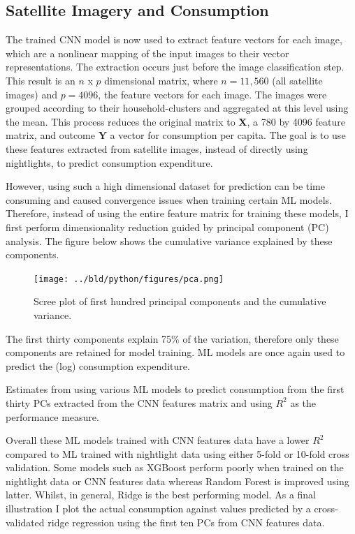 \documentclass[11pt, a4paper, leqno]{article}
\begin{document}
\subsection{Satellite Imagery and Consumption}

 The trained CNN model is now used to extract feature vectors for each image, which are a nonlinear mapping of the input images to their vector representations. The extraction occurs just before the image classification step. This result is an $n$ x $p$ dimensional matrix, where $n = 11,560$ (all satellite images) and $p = 4096$, the feature vectors for each image. The images were grouped according to their household-clusters and aggregated at this level using the mean. This process reduces the original matrix to $\textbf{X}$, a 780 by 4096 feature matrix, and outcome $\textbf{Y}$ a vector for consumption per capita. The goal is to use these features extracted from satellite images, instead of directly using nightlights, to predict consumption expenditure.

 However, using such a high dimensional dataset for prediction can be time consuming and caused convergence issues when training certain ML models. Therefore, instead of using the entire feature matrix for training these models, I first perform dimensionality reduction guided by principal component (PC) analysis. The figure below shows the cumulative variance explained by these components. 

\begin{figure}[H]
\centering
    \texttt{[image: ../bld/python/figures/pca.png]}
    \caption{Scree plot of first hundred principal components and the cumulative variance.}
    \label{fig:python-predictions}
\end{figure}

 The first thirty components explain 75\% of the variation, therefore only these components are retained for model training. ML models are once again used to predict the (log) consumption expenditure.

\begin{table}[H]
\centering
    \scalebox{1.1}{}
	\caption{Estimates from using various ML models to predict consumption from the first thirty PCs extracted from the CNN features matrix and using $R^2$ as the performance measure.}
\end{table}

 Overall these ML models trained with CNN features data have a lower $R^2$  compared to ML trained with nightlight data using either 5-fold or 10-fold cross validation. Some models such as XGBoost perform poorly when trained on the nightlight data or CNN features data whereas Random Forest is improved using latter. Whilst, in general, Ridge is the best performing model. As a final illustration I plot the actual consumption against values predicted by a cross-validated ridge regression using the first ten PCs from CNN features data.
\end{document}

